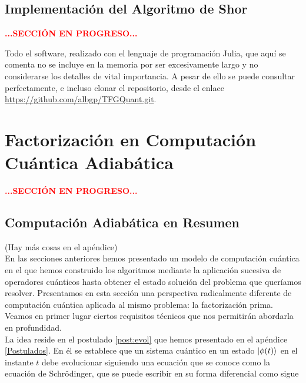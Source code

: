 \documentclass[11pt, spanish]{report}
\newcommand{\red}[1]{\textcolor{red}{#1}}
\numberwithin{equation}{section}
\numberwithin{defin}{section}
\begin{document}
%

\section{Implementación del Algoritmo de Shor}

\begin{center}
\red{\textbf{...SECCIÓN EN PROGRESO...}}
\end{center}


Todo el software, realizado con el lenguaje de programación Julia, que aquí se comenta no se incluye en la memoria por ser excesivamente largo y no considerarse los detalles de vital importancia. A pesar de ello se puede consultar perfectamente, e incluso clonar el repositorio, desde el enlace \url{https://github.com/albgp/TFGQuant.git}.


\chapter{Factorización en Computación Cuántica Adiabática} \label{seq:adiabatica}
\begin{center}
\red{\textbf{...SECCIÓN EN PROGRESO...}}
\end{center}

\section{Computación Adiabática en Resumen}\label{AQCBrief}

(Hay más cosas en el apéndice)\\

En las secciones anteriores hemos presentado un modelo de computación cuántica en el que hemos construido los algoritmos mediante la aplicación sucesiva de operadores cuánticos hasta obtener el estado solución del problema que queríamos resolver. Presentamos en esta sección una perspectiva radicalmente diferente de computación cuántica aplicada al mismo problema: la factorización prima. Veamos en primer lugar ciertos requisitos técnicos que nos permitirán abordarla en profundidad.\\

La idea reside en el postulado \ref{post:evol} que hemos presentado en el apéndice \ref{Postulados}. En él se establece que un sistema cuántico en un estado $\ket{\phi(t)}$ en el instante $t$ debe evolucionar siguiendo una ecuación que se conoce como la ecuación de Schrödinger, que se puede escribir en su forma diferencial como sigue
\end{document}
